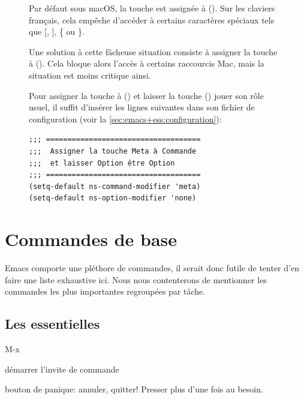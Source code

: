 \begin{figure}[t]
  \begin{osx}
    Par défaut sous macOS, la touche  est assignée à
     (\optkey). Sur les claviers français, cela empêche
    d'accéder à certains caractères spéciaux tels que [, ], \{ ou \}.

    Une solution à cette fâcheuse situation consiste à assigner
    la touche  à  (\cmdkey). Cela bloque
    alors l'accès à certains raccourcis Mac, mais la situation est
    moins critique ainsi.

    Pour assigner la touche  à  (\cmdkey) et
    laisser la touche  (\optkey) jouer son rôle usuel, il
    suffit d'insérer les lignes suivantes dans son fichier de
    configuration  (voir la
    \autoref{sec:emacs+ess:configuration}):
\begin{verbatim}
;;; ====================================
;;;  Assigner la touche Meta à Commande
;;;  et laisser Option être Option
;;; ====================================
(setq-default ns-command-modifier 'meta)
(setq-default ns-option-modifier 'none)
\end{verbatim}
  \end{osx}
  \label{fig:ess:meta}
\end{figure}



\section{Commandes de base}
\label{sec:emacs+ess:commandes}

Emacs comporte une pléthore de commandes, il serait donc futile de
tenter d'en faire une liste exhaustive ici. Nous nous contenterons de
mentionner les commandes les plus importantes regroupées par tâche.

\subsection{Les essentielles}
\label{sec:emacs+ess:commandes:essentielles}

\begin{ttscript}{M-x}
\item[\code{M-x}] démarrer l'invite de commande
\item[\code{C-g}] bouton de panique: annuler, quitter! Presser plus
  d'une fois au besoin.
\end{ttscript}

